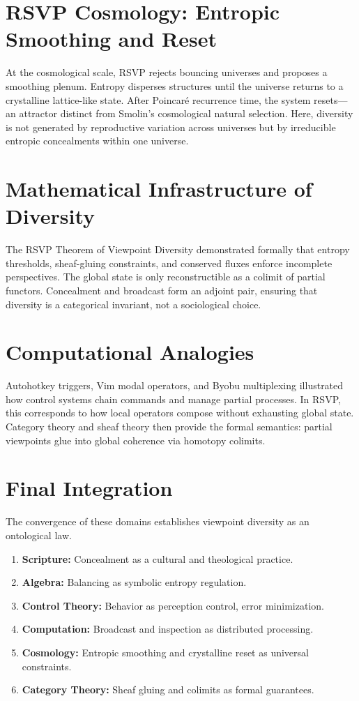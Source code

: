 \documentclass[a4paper,11pt,openany]{book}
\begin{document}
\section{RSVP Cosmology: Entropic Smoothing and Reset}
At the cosmological scale, RSVP rejects bouncing universes and proposes a smoothing plenum. 
Entropy disperses structures until the universe returns to a crystalline lattice-like state. After 
Poincaré recurrence time, the system resets—an attractor distinct from Smolin’s cosmological natural 
selection. Here, diversity is not generated by reproductive variation across universes but by 
irreducible entropic concealments within one universe.

\section{Mathematical Infrastructure of Diversity}
The RSVP Theorem of Viewpoint Diversity demonstrated formally that entropy thresholds, 
sheaf-gluing constraints, and conserved fluxes enforce incomplete perspectives. The global state 
is only reconstructible as a colimit of partial functors. Concealment and broadcast form an 
adjoint pair, ensuring that diversity is a categorical invariant, not a sociological choice.  

\section{Computational Analogies}
Autohotkey triggers, Vim modal operators, and Byobu multiplexing illustrated how control systems 
chain commands and manage partial processes. In RSVP, this corresponds to how local operators 
compose without exhausting global state. Category theory and sheaf theory then provide the 
formal semantics: partial viewpoints glue into global coherence via homotopy colimits.

\section{Final Integration}
The convergence of these domains establishes viewpoint diversity as an ontological law. 
\begin{enumerate}
  \item \textbf{Scripture:} Concealment as a cultural and theological practice.  
  \item \textbf{Algebra:} Balancing as symbolic entropy regulation.  
  \item \textbf{Control Theory:} Behavior as perception control, error minimization.  
  \item \textbf{Computation:} Broadcast and inspection as distributed processing.  
  \item \textbf{Cosmology:} Entropic smoothing and crystalline reset as universal constraints.  
  \item \textbf{Category Theory:} Sheaf gluing and colimits as formal guarantees.  
\end{enumerate}
\end{document}
